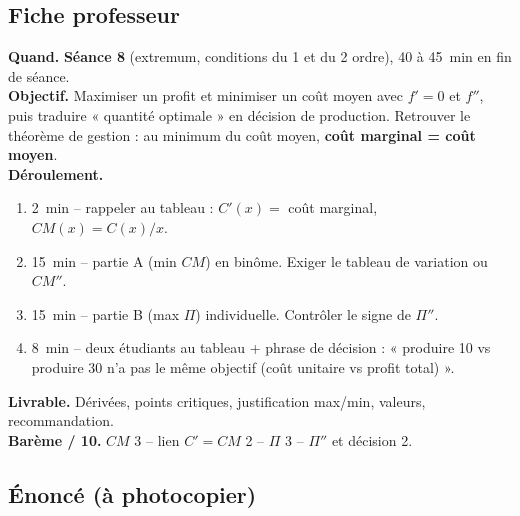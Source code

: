 \documentclass[12pt,a4paper]{article}
\begin{document}
\subsection{Fiche professeur}

\begin{profbox}
\textbf{Quand.} \textbf{Séance 8} (extremum, conditions du 1 et du 2 ordre), 40 à 45~min en fin de séance.\\
\textbf{Objectif.} Maximiser un profit et minimiser un coût moyen avec $f'=0$ et $f''$, puis traduire « quantité optimale » en décision de production. Retrouver le théorème de gestion : au minimum du coût moyen, \textbf{coût marginal = coût moyen}.\\
\textbf{Déroulement.}
\begin{enumerate}[leftmargin=1.3cm]
  \item 2~min -- rappeler au tableau : $C'(x)=$ coût marginal, $CM(x)=C(x)/x$.
  \item 15~min -- partie A (min $CM$) en binôme. Exiger le tableau de variation ou $CM''$.
  \item 15~min -- partie B (max $\Pi$) individuelle. Contrôler le signe de $\Pi''$.
  \item 8~min -- deux étudiants au tableau + phrase de décision : « produire 10 vs produire 30 n'a pas le même objectif (coût unitaire vs profit total) ».
\end{enumerate}
\textbf{Livrable.} Dérivées, points critiques, justification max/min, valeurs, recommandation.\\
\textbf{Barème / 10.} $CM$ 3 -- lien $C'=CM$ 2 -- $\Pi$ 3 -- $\Pi''$ et décision 2.
\end{profbox}

\subsection{Énoncé (à photocopier)}
\end{document}
